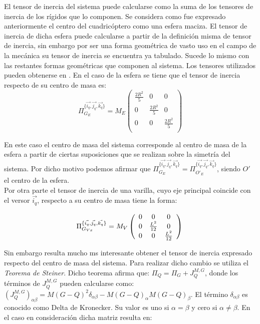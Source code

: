 \documentclass[main]{subfiles}
\begin{document}
\label{tensores}

El tensor de inercia del sistema puede calcularse como la suma de los tensores de inercia de los rígidos que lo componen. Se considera como fue expresado anteriormente el centro del cuadricóptero como una esfera maciza. El tensor de inercia de dicha esfera puede calcularse a partir de la definición misma de tensor de inercia, sin embargo por ser una forma geométrica de vasto uso en el campo de la mecánica su tensor de inercia se encuentra ya tabulado. Sucede lo mismo con las restantes formas geométricas que componen al sistema. Los tensores utilizados pueden obtenerse en \cite{bib:inercia}. En el caso de la esfera se tiene que el tensor de inercia respecto de  su centro de masa es:
$$
\Pi_{G_E}^{\{\vec{i_q}, \vec{j_q}, \vec{k_q}\}}= M_E\left(\begin{array}{ccc}
\frac{2R^2}{5}  &0&  0\\
0  &\frac{2R^2}{5} & 0\\
0  &0 & \frac{2R^2}{5} \\
\end{array}\right) 
$$

En este caso el centro de masa del sistema corresponde al centro de masa de la esfera a partir de ciertas suposiciones que se realizan sobre la simetría del sistema. Por dicho motivo podemos afirmar que $\Pi_{G_E}^{\{\vec{i_q}, \vec{j_q}, \vec{k_q}\}} = \Pi_{O\prime _E}^{\{\vec{i_q}, \vec{j_q}, \vec{k_q}\}} $, siendo $O\prime$ el centro de la esfera.\\

Por otra parte el tensor de inercia de una varilla, cuyo eje principal coincide con el versor $\vec{i_q}$, respecto a su centro de masa tiene la forma:

$$
\Pi_{G_{Vx}}^{\{\vec{i_q}, \vec{j_q}, \vec{k_q}\}}= M_V\left(\begin{array}{ccc}
0  &0&  0\\
0  &\frac{L^2}{12} & 0\\
0  &0 & \frac{L^2}{12}  \\
\end{array}\right) \\ 
$$

Sin embargo resulta mucho ms interesante obtener el tensor de inercia expresado respecto del centro de masa del sistema. Para realizar dicho cambio se utiliza el \emph{Teorema de Steiner}. Dicho teorema afirma que: $\Pi_Q = \Pi_G +J_Q^{M,G}$, donde los términos de $J_Q^{M,G}$ pueden calcularse como: $(J_Q^{M,G})_{\alpha \beta} = M(G-Q)^2\delta_{\alpha \beta}-M(G-Q)_{\alpha}M(G-Q)_{\beta}$. El término $\delta_{\alpha \beta}$ es conocido como Delta de Kronecker. Su valor es uno si $\alpha =\beta$ y cero si $\alpha \neq \beta$. En el caso en consideración dicha matriz resulta en:
\end{document}

